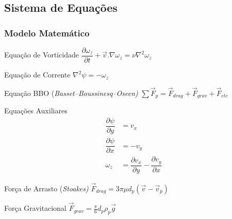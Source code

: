 \documentclass{beamer}
\newcommand{\partfrac}[3] %
{
  \ensuremath{\dfrac{\partial{#2}}{\partial{#3}}}
}
\begin{document}
\subsection{Sistema de Equações}
\begin{frame}
  \frametitle{Modelo Matemático}
  \begin{minipage}{.48\textwidth}
    \begin{block}{Equação de Vorticidade}
      \centering
      $\partfrac2{\omega_z}{t} + \vec{v}.\nabla\omega_z = \nu \nabla^2 \omega_z$
    \end{block}

    \begin{block}{Equação de Corrente}
      \centering
      $\nabla^2 \psi = -\omega_z$
    \end{block}
    
    \begin{block}{Equação BBO (\it{Basset–Boussinesq–Oseen})}
      \centering
      $\sum \vec{F}_p = \vec{F}_{drag} + \vec{F}_{grav} + \vec{F}_{etc}$
    \end{block}
  \end{minipage}
  \hfill
  \begin{minipage}{.48\textwidth}
    \begin{block}{Equações Auxiliares}
      \vspace*{-\baselineskip}\setlength\belowdisplayshortskip{0pt} %
      \centering
      \begin{align*}
	\partfrac2{\psi}{y} &= v_x \\
	\partfrac2{\psi}{x} &= -v_y \\
	\omega_z &= \partfrac2{v_x}{y} - \partfrac2{v_y}{x} 
      \end{align*}
    \end{block}
    
    \begin{block}{Força de Arrasto (\it{Stoakes})}
      \centering
      $\vec{F}_{drag} = 3 \pi \mu d_p (\vec{v} - \vec{v}_p)$
    \end{block}
    
    \begin{block}{Força Gravitacional}
      \centering
      $\vec{F}_{grav} = \tfrac{\pi}{6} d_p \rho_p \vec{g}$
    \end{block}
  \end{minipage}
  
\end{frame}
\end{document}
